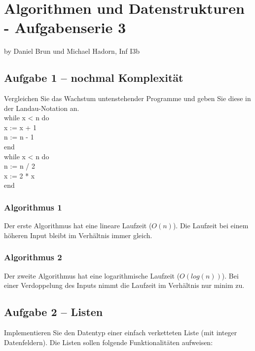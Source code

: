 
\chapter*{Algorithmen und Datenstrukturen - Aufgabenserie 3}
\begin{flushright}
by Daniel Brun und Michael Hadorn, Inf I3b
\end{flushright}
\section*{Aufgabe 1 – nochmal Komplexität}

Vergleichen Sie das Wachstum untenstehender Programme und geben Sie diese in der Landau-Notation an.\\

\noindent
while x < n do\\
	x := x + 1\\
	n := n - 1\\	
end\\

\noindent
while x < n do\\
	n := n / 2\\
	x := 2 * x\\
end\\

\subsection*{Algorithmus 1}
Der erste Algorithmus hat eine lineare Laufzeit ($O(n)$). Die Laufzeit bei einem höheren Input bleibt im Verhältnis immer gleich.

\subsection*{Algorithmus 2}
Der zweite Algorithmus hat eine logarithmische Laufzeit ($O(log(n))$). Bei einer Verdoppelung des Inputs nimmt die Laufzeit im Verhältnis nur minim zu.

\newpage

\section*{Aufgabe 2 – Listen}
Implementieren Sie den Datentyp einer einfach verketteten Liste (mit integer Datenfeldern). Die Listen sollen folgende Funktionalitäten aufweisen:\\

